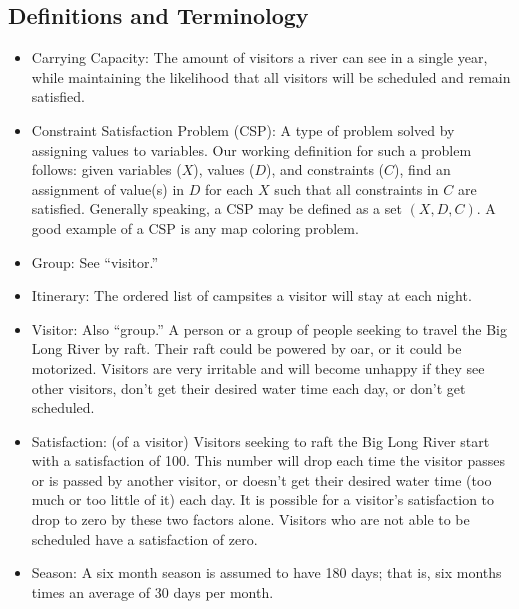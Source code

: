 \documentclass[11pt]{article} %
\begin{document}
\subsection{Definitions and Terminology}
\label{sec:defs}
\begin{itemize}
\item Carrying Capacity: The amount of visitors a river can see in a single
year, while maintaining the likelihood that all visitors will be scheduled and
remain satisfied.
\item Constraint Satisfaction Problem (CSP): A type of problem solved by
assigning values to variables. Our working definition for such a
problem follows: given variables ($X$), values ($D$),
and constraints ($C$), find an assignment of value(s) in $D$
for each $X$ such that all constraints in $C$ are satisfied.  Generally
speaking, a CSP may be defined as a set $(X,D,C)$.
A good example of a CSP is any map coloring problem\cite{DynamicCSP}.

\item Group: See ``visitor.''

\item Itinerary: The ordered list of campsites a visitor will stay at each
night.

\item Visitor: Also ``group.'' A person or a group of people
seeking to travel the Big Long River by raft. Their raft could be powered
by oar, or it could be motorized. Visitors are very irritable and will
become unhappy if they see other visitors, don't get their desired water
time each day, or don't get scheduled.

\item Satisfaction: (of a visitor) Visitors seeking to raft the Big Long River
start with a satisfaction of 100. This number will drop each time the visitor
passes or is passed by another visitor, or doesn't get their desired water time 
(too much or too little of it) each day. It is possible for a visitor's 
satisfaction to drop to zero by these two factors alone. Visitors who are not 
able to be scheduled have a satisfaction of zero.

\item Season: A six month season is assumed to have 180 days; that is,
six months times an average of 30 days per month.


\end{itemize}
\end{document}
